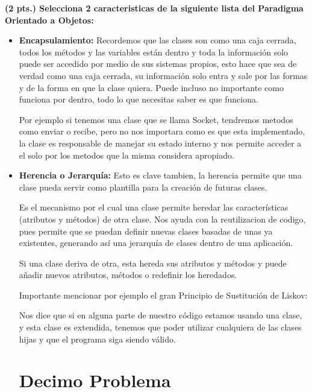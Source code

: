\documentclass[journal,12pt,onecolumn]{IEEEtran}                %
\theoremstyle{break}                                            %
\begin{document}
      \textbf{(2 pts.) Selecciona 2 caracteristicas de la siguiente lista del Paradigma Orientado a Objetos:}
      \begin{itemize}
        \item 
          \textbf{Encapsulamiento:} Recordemos que las clases son como una caja cerrada, 
          todos los métodos y las variables están dentro y toda la información 
          solo puede ser accedido por medio de sus sistemas propios, 
          esto hace que sea de verdad como una caja cerrada, 
          su información solo entra y sale por las formas y de 
          la forma en que la clase quiera. 
          Puede incluso no importante como funciona por dentro, todo lo que 
          necesitas saber es que funciona.

          Por ejemplo si tenemos una clase que se llama Socket, tendremos metodos como
          enviar o recibe, pero no nos importara como es que esta implementado, la clase es responsable
          de manejar su estado interno y nos permite acceder a el solo por los metodos que la misma considera
          apropiado.
        
        \item 
          \textbf{Herencia o Jerarquía: }
          Esto es clave tambien, la herencia permite que una 
          clase pueda servir como plantilla para la creación de futuras 
          clases.

          Es el mecanismo por el cual una clase permite heredar 
          las características (atributos y métodos) de otra clase.
          Nos ayuda con la reutilizacion de codigo, pues permite que se puedan definir nuevas 
          clases basadas de unas ya existentes, generando así una jerarquía de clases dentro de una aplicación. 
          
          Si una clase deriva de otra, esta hereda sus atributos y métodos 
          y puede añadir nuevos atributos, métodos o redefinir los heredados.

          Importante mencionar por ejemplo el gran Principio de Sustitución de Liskov:
          
          Nos dice que si en alguna parte de nuestro código estamos usando una clase,
           y esta clase es extendida, tenemos que poder utilizar cualquiera de las 
           clases hijas y que el programa siga siendo válido.

      \section*{Decimo Problema}


\end{itemize}
\end{document}
